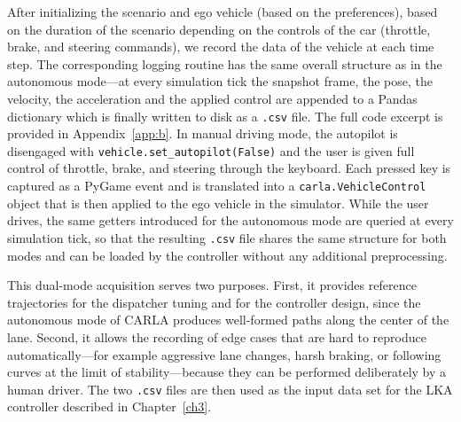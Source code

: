 After initializing the scenario and ego vehicle (based on the preferences), based on the duration of the scenario depending on the controls of the car (throttle, brake, and steering commands), we record the data of the vehicle at each time step. The corresponding logging routine has the same overall structure as in the autonomous mode---at every simulation tick the snapshot frame, the pose, the velocity, the acceleration and the applied control are appended to a Pandas dictionary which is finally written to disk as a \texttt{.csv} file. The full code excerpt is provided in Appendix~\ref{app:b}.
\hyphenation{}
In manual driving mode, the autopilot is disengaged with \texttt{vehicle.set\_autopilot(False)} and the user is given full control of throttle, brake, and steering through the keyboard. Each pressed key is captured as a PyGame event and is translated into a \texttt{carla.VehicleControl} object that is then applied to the ego vehicle in the simulator. While the user drives, the same getters introduced for the autonomous mode are queried at every simulation tick, so that the resulting \texttt{.csv} file shares the same structure for both modes and can be loaded by the controller without any additional preprocessing.

This dual-mode acquisition serves two purposes. First, it provides reference trajectories for the dispatcher tuning and for the controller design, since the autonomous mode of CARLA produces well-formed paths along the center of the lane. Second, it allows the recording of edge cases that are hard to reproduce automatically---for example aggressive lane changes, harsh braking, or following curves at the limit of stability---because they can be performed deliberately by a human driver. The two \texttt{.csv} files are then used as the input data set for the \ac{LKA} controller described in Chapter~\ref{ch3}.